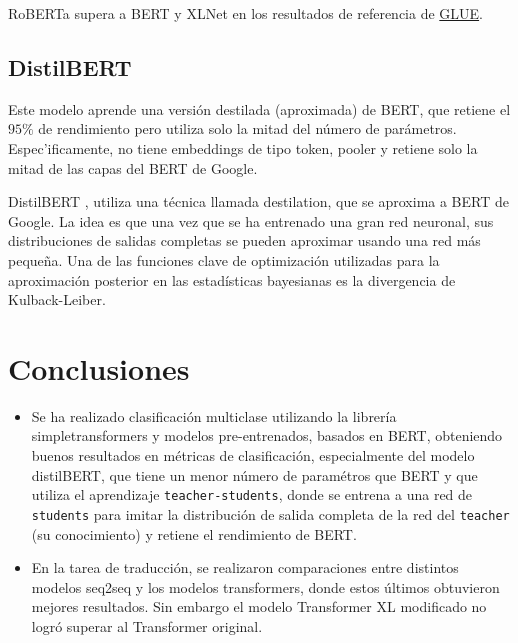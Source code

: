 \documentclass[conference]{IEEEtran}
\begin{document}
\vspace{0.2cm}

RoBERTa supera a BERT y XLNet en los resultados de referencia de \href{https://gluebenchmark.com/}{GLUE}.

\subsection{DistilBERT}

Este modelo aprende una versión destilada (aproximada) de BERT, que retiene el $95\%$ de rendimiento pero utiliza solo la mitad del n\'umero de par\'ametros. Espec'ificamente, no tiene embeddings de tipo token, pooler y retiene solo la mitad de las capas del BERT de Google.

DistilBERT \cite{b11}, utiliza una técnica llamada destilation, que se aproxima a BERT de Google. La idea es que una vez que se ha entrenado una gran red neuronal, sus distribuciones de salidas completas se pueden aproximar usando una red más pequeña. Una de las funciones clave de optimización utilizadas para la aproximación posterior en las estadísticas bayesianas es la divergencia de Kulback-Leiber.

\section{Conclusiones}

\begin{itemize}
\item Se ha realizado clasificaci\'on multiclase utilizando la librer\'ia simpletransformers y modelos pre-entrenados, basados en BERT, obteniendo buenos resultados en m\'etricas de clasificaci\'on, especialmente del modelo distilBERT, que tiene un menor n\'umero de param\'etros que BERT y que utiliza el aprendizaje \texttt{teacher-students}, donde se entrena a una red de \texttt{students} para imitar la distribuci\'on de salida completa de la red del \texttt{teacher} (su conocimiento) y retiene el rendimiento de BERT.
\item En la tarea de traducci\'on, se realizaron comparaciones entre distintos modelos seq2seq y los modelos transformers, donde estos \'ultimos obtuvieron mejores resultados. Sin embargo el modelo Transformer XL modificado no logr\'o superar al Transformer original.
\end{itemize}
\end{document}
